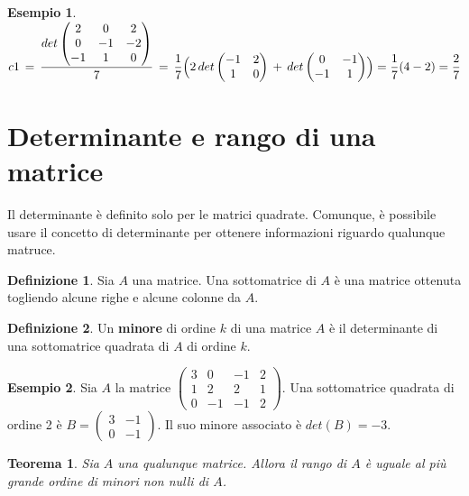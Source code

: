 \documentclass[a4paper]{report}
\newtheorem{teoremaDet}{Teorema}[section]
\theoremstyle{remark}
\theoremstyle{definition}
\newtheorem{detDef}{Definizione}
\newtheorem{es}{Esempio}
\begin{document}
\begin{es}
	$ c1\,=\,\dfrac{det
	\begin{pmatrix}
		2 & 0 & 2\\
		0 & -1 & -2\\
		-1 & 1 & 0
	\end{pmatrix}}{7} 
	\,=\,\dfrac{1}{7}\Bigl( 2\,det
	\begin{pmatrix}
		-1 & 2\\
		1 & 0
	\end{pmatrix}
	\,+\,det
	\begin{pmatrix}
		0 & -1\\
		-1 & 1
	\end{pmatrix}\Bigr)
	= \dfrac{1}{7}(4-2)=\dfrac{2}{7}$
\end{es}
%
\section{Determinante e rango di una matrice}
Il determinante è definito solo per le matrici quadrate. Comunque, è possibile usare il concetto di determinante per ottenere informazioni riguardo qualunque matruce.
\begin{detDef}
	Sia $ A $ una matrice. Una sottomatrice di $ A $ è una matrice ottenuta togliendo alcune righe e alcune colonne da $ A $.
\end{detDef}
\begin{detDef}
	Un \textbf{minore} di ordine $ k $ di una matrice $ A $ è il determinante di una sottomatrice quadrata di $ A $ di ordine $ k $.
\end{detDef}
\begin{es}
	Sia $ A $ la matrice $ 
	\begin{pmatrix}
		3 & 0 & -1 & 2\\
		1 & 2 & 2 & 1\\
		0 & -1 & -1 & 2
	\end{pmatrix} $.
	Una sottomatrice quadrata di ordine 2 è $ B= 
	\begin{pmatrix}
		3&-1\\
		0&-1
	\end{pmatrix}$.
	Il suo minore associato è $ det(B)=-3 $.
\end{es}
\begin{teoremaDet}
	Sia $A$ una qualunque matrice. Allora il rango di $A$ è uguale al più grande ordine di minori non nulli di $A$.
\end{teoremaDet}
\end{document}
